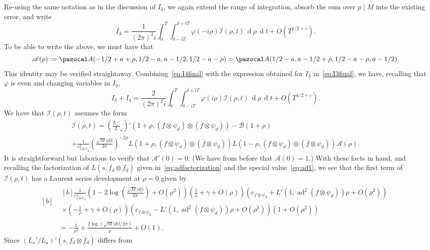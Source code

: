 \documentclass[11pt,reqno]{amsart} \usepackage{fullpage}
\newcommand{\vep}{\varepsilon}
\renewcommand{\d}[1]{\,\operatorname*{d}\!{#1}}
\newcommand\be{\begin{equation}}
\newcommand\ee{\end{equation}}
\DeclareMathOperator{\ad}{ad}
\newcommand{\Lunram}{L_{\star}}
\numberwithin{equation}{section}
\begin{document}
Re-using the same notation as in the discussion of $I_3$, we again extend the range of
integration, absorb the sum over $p\mid M$ into the existing error, and write
\be\label{eq:I4final}
I_4=\frac1{(2\pi)^2i}\int_0^T\int_{\delta-iT}^{\delta+iT}\varphi(-i\rho)
\mathcal I(\rho,t)\d\rho\d t+O\left(T^{1/2+\vep}\right).\ee
To be able to write the above, we must have that
\be\label{def:mathcalA}\mathcal A(\rho):=\pazocal A(-1/2+a+\rho,1/2-a,a-1/2,1/2-a-\rho)
=\pazocal A(1/2-a,a-1/2+\rho,1/2-a-\rho,a-1/2).\ee
This identity may be verified straightaway.
Combining~\eqref{eq:I4final} with the expression obtained for $I_3$ in~\eqref{eq:I3final},
we have, recalling that $\varphi$ is even and changing variables in $I_3$,
\be\label{eq:I3I4}
I_3+I_4=\frac2{(2\pi)^2i}\int_0^T\int_{\delta-iT}^{\delta+iT}\varphi(i\rho)
\mathcal I(\rho,t)\d\rho\d t+O\left(T^{1/2+\vep}\right).\ee
We have that $\mathcal I(\rho,t)$ assumes the form
\begin{multline}\mathcal I(\rho,t)=\left(\frac{\Lunram'}\Lunram\right)'
\left(1+\rho,(f\otimes\psi_d)\otimes(\overline f\otimes\psi_d)\right)-\mathcal B(1+\rho) \\
+\frac{1}{c_{f\otimes\psi_d}^2}\left(\frac{\sqrt M|d|t}{2\pi}\right)^{-2\rho}
L(1+\rho,(f\otimes\psi_d)\otimes(\overline f\otimes\psi_d))
L(1-\rho,(f\otimes\psi_d)\otimes(\overline f\otimes\psi_d))
\mathcal A(\rho).\end{multline}
It is straightforward but laborious to verify that $\mathcal A'(0)=0$.
(We have from before that $\mathcal A(0)=1$.)
With these facts in hand, and recalling the factorization of $L(s,f_d\otimes\overline f_d)$
given in~\eqref{eq:adfactorization} and the special value~\eqref{eq:ad1}, we see that the
first term of $\mathcal I(\rho,t)$ has a Laurent series development at $\rho=0$ given by
\be\begin{aligned}[b]&\begin{multlined}[b]\frac1{c_{f\otimes\psi_d}^2}
\left(1-2\log\left(\frac{\sqrt M|d|t}{2\pi}\right)+O(\rho^2)\right)
\left(\frac1\rho+\gamma+O(\rho)\right)
\left(c_{f\otimes\psi_d}+L'(1,\ad^2(f\otimes\psi_d))\rho+O(\rho^2)\right) \\
\times\left(-\frac1\rho+\gamma+O(\rho)\right)
\left(c_{f\otimes\psi_d}-L'(1,\ad^2(f\otimes\psi_d))\rho+O(\rho^2)\right)
\left(1+O(\rho^2)\right)\end{multlined} \\
&=-\frac1{\rho^2}+\frac{2\log\left(\sqrt M|d|t/2\pi\right)}{\rho}+O(1).
\end{aligned}\ee
Since $(\Lunram'/\Lunram)'(s,f_d\otimes\overline f_d)$ differs from
\end{document}
